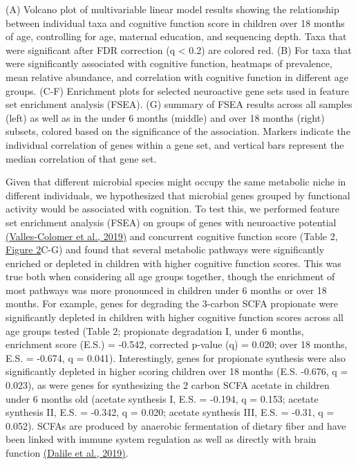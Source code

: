 \documentclass[
]{article}
\begin{document}
(A) Volcano plot of multivariable linear model results showing the
relationship between individual taxa and cognitive function score in
children over 18 months of age, controlling for age, maternal education,
and sequencing depth. Taxa that were significant after FDR correction (q
\textless{} 0.2) are colored red. (B) For taxa that were significantly
associated with cognitive function, heatmaps of prevalence, mean
relative abundance, and correlation with cognitive function in different
age groups. (C-F) Enrichment plots for selected neuroactive gene sets
used in feature set enrichment analysis (FSEA). (G) summary of FSEA
results across all samples (left) as well as in the under 6 months
(middle) and over 18 months (right) subsets, colored based on the
significance of the association. Markers indicate the individual
correlation of genes within a gene set, and vertical bars represent the
median correlation of that gene set.

Given that different microbial species might occupy the same metabolic
niche in different individuals, we hypothesized that microbial genes
grouped by functional activity would be associated with cognition. To
test this, we performed feature set enrichment analysis (FSEA) on groups
of genes with neuroactive potential
\href{https://www.zotero.org/google-docs/?xQURsj}{(Valles-Colomer et
al., 2019)} and concurrent cognitive function score (Table 2,
\protect\hyperlink{_i7fd3z19jdvg}{\uline{Figure 2}}C-G) and found that
several metabolic pathways were significantly enriched or depleted in
children with higher cognitive function scores. This was true both when
considering all age groups together, though the enrichment of most
pathways was more pronounced in children under 6 months or over 18
months. For example, genes for degrading the 3-carbon SCFA propionate
were significantly depleted in children with higher cognitive function
scores across all age groups tested (Table 2; propionate degradation I,
under 6 months, enrichment score (E.S.) = -0.542, corrected p-value (q)
= 0.020; over 18 months, E.S. = -0.674, q = 0.041). Interestingly, genes
for propionate synthesis were also significantly depleted in higher
scoring children over 18 months (E.S. -0.676, q = 0.023), as were genes
for synthesizing the 2 carbon SCFA acetate in children under 6 months
old (acetate synthesis I, E.S. = -0.194, q = 0.153; acetate synthesis
II, E.S. = -0.342, q = 0.020; acetate synthesis III, E.S. = -0.31, q =
0.052). SCFAs are produced by anaerobic fermentation of dietary fiber
and have been linked with immune system regulation as well as directly
with brain function
\href{https://www.zotero.org/google-docs/?2Z0sKZ}{(Dalile et al.,
2019)}.
\end{document}
